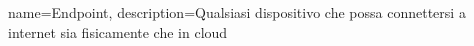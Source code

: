 {
	name={Endpoint},
	description={Qualsiasi dispositivo che possa connettersi a internet sia fisicamente che in cloud}
}